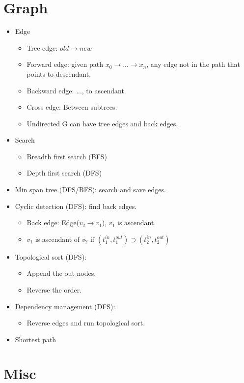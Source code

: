 \documentclass[twocolumn]{article}
\begin{document}

\section{Graph}
\begin{itemize}
\item Edge
  \begin{itemize}
  \item Tree edge: $old \rightarrow new$
  \item Forward edge: given path $x_0 \rightarrow ... \rightarrow x_n$, any edge not in the path that points to descendant.
  \item Backward edge: ..., to ascendant.
  \item Cross edge: Between subtrees.
  \item Undirected G can have tree edges and back edges.
  \end{itemize}
\item Search
  \begin{itemize}
  \item Breadth first search (BFS)
  \item Depth first search (DFS)
  \end{itemize}
\item Min span tree (DFS/BFS): search and save edges.
\item Cyclic detection (DFS): find back edges.
  \begin{itemize}
  \item Back edge: Edge($v_2 \rightarrow v_1$), $v_1$ is ascendant.
  \item $v_1$ is ascendant of $v_2$ if $(t_1^{in}, t_1^{out}) \supset (t_2^{in}, t_2^{out})$
  \end{itemize}
\item Topological sort (DFS):
  \begin{itemize}
  \item Append the out nodes.
  \item Reverse the order.
  \end{itemize}
\item Dependency management (DFS):
  \begin{itemize}
  \item Reverse edges and run topological sort.
  \end{itemize}
\item Shortest path
\end{itemize}


\section{Misc}


\end{document}
